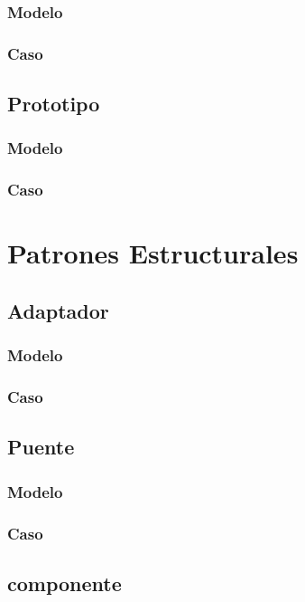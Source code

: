 \subsubsection{Modelo}
\newpage
\subsubsection{Caso}
\newpage

\subsection{Prototipo}
\subsubsection{Modelo}
\newpage
\subsubsection{Caso}
\newpage

\section{Patrones Estructurales}

\subsection{Adaptador}
\subsubsection{Modelo}
\newpage
\subsubsection{Caso}
\newpage


\subsection{Puente}
\subsubsection{Modelo}
\newpage
\subsubsection{Caso}
\newpage

\subsection{componente}
